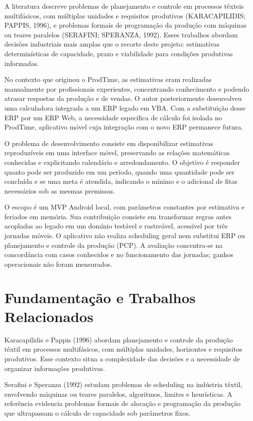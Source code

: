 \documentclass[12pt]{article}
\begin{document}
A literatura descreve problemas de planejamento e controle em processos têxteis multifásicos, com múltiplas unidades e requisitos produtivos (KARACAPILIDIS; PAPPIS, 1996), e problemas formais de programação da produção com máquinas ou teares paralelos (SERAFINI; SPERANZA, 1992). Esses trabalhos abordam decisões industriais mais amplas que o recorte deste projeto: estimativas determinísticas de capacidade, prazo e viabilidade para condições produtivas informadas.

No contexto que originou o ProdTime, as estimativas eram realizadas manualmente por profissionais experientes, concentrando conhecimento e podendo atrasar respostas da produção e de vendas. O autor posteriormente desenvolveu uma calculadora integrada a um ERP legado em VBA. Com a substituição desse ERP por um ERP Web, a necessidade específica de cálculo foi isolada no ProdTime, aplicativo móvel cuja integração com o novo ERP permanece futura.

O problema de desenvolvimento consiste em disponibilizar estimativas reproduzíveis em uma interface móvel, preservando as relações matemáticas conhecidas e explicitando calendário e arredondamento. O objetivo é responder quanto pode ser produzido em um período, quando uma quantidade pode ser concluída e se uma meta é atendida, indicando o mínimo e o adicional de fitas necessários sob as mesmas premissas.

O escopo é um MVP Android local, com parâmetros constantes por estimativa e feriados em memória. Sua contribuição consiste em transformar regras antes acopladas ao legado em um domínio testável e rastreável, acessível por três jornadas móveis. O aplicativo não realiza scheduling geral nem substitui ERP ou planejamento e controle da produção (PCP). A avaliação concentra-se na concordância com casos conhecidos e no funcionamento das jornadas; ganhos operacionais não foram mensurados.

\section{Fundamentação e Trabalhos Relacionados}\label{fundamentauxe7uxe3o-e-trabalhos-relacionados}

Karacapilidis e Pappis (1996) abordam planejamento e controle da produção têxtil em processos multifásicos, com múltiplas unidades, horizontes e requisitos produtivos. Esse contexto situa a complexidade das decisões e a necessidade de organizar informações produtivas.

Serafini e Speranza (1992) estudam problemas de scheduling na indústria têxtil, envolvendo máquinas ou teares paralelos, algoritmos, limites e heurísticas. A referência evidencia problemas formais de alocação e programação da produção que ultrapassam o cálculo de capacidade sob parâmetros fixos.
\end{document}
